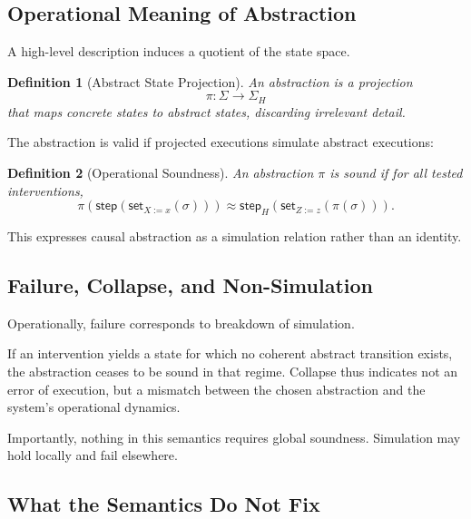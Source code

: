 \documentclass[11pt]{article}
\newtheorem{definition}{Definition}
\begin{document}
\subsection{Operational Meaning of Abstraction}

A high-level description induces a quotient of the state space.

\begin{definition}[Abstract State Projection]
An abstraction is a projection
\[
\pi : \Sigma \rightarrow \Sigma_H
\]
that maps concrete states to abstract states, discarding irrelevant detail.
\end{definition}

The abstraction is valid if projected executions simulate abstract executions:

\begin{definition}[Operational Soundness]
An abstraction $\pi$ is sound if for all tested interventions,
\[
\pi(\mathsf{step}(\mathsf{set}_{X := x}(\sigma))) \approx
\mathsf{step}_H(\mathsf{set}_{Z := z}(\pi(\sigma))).
\]
\end{definition}

This expresses causal abstraction as a simulation relation rather than an identity.

\subsection{Failure, Collapse, and Non-Simulation}

Operationally, failure corresponds to breakdown of simulation.

If an intervention yields a state for which no coherent abstract transition exists, the abstraction ceases to be sound in that regime. Collapse thus indicates not an error of execution, but a mismatch between the chosen abstraction and the system’s operational dynamics.

Importantly, nothing in this semantics requires global soundness. Simulation may hold locally and fail elsewhere.

\subsection{What the Semantics Do Not Fix}
\end{document}
